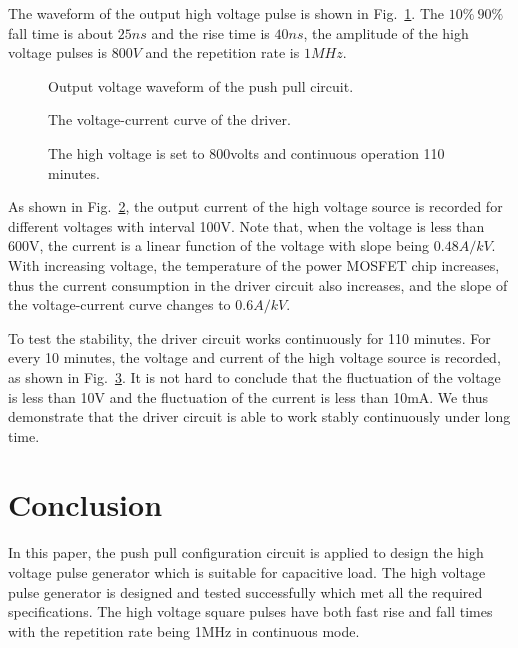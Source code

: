 \documentclass[aip,rsi,reprint,graphicx]{revtex4-1} %
\begin{document}
The waveform of the output high voltage pulse is shown in Fig.~\ref{Fig4}. The $10\%~90\%$ fall time is about $25ns$ and the rise time is $40 ns$, the amplitude of the high voltage pulses is $800V$ and the repetition rate is $1MHz$.

\begin{figure}
\caption{Output voltage waveform of the push pull circuit.\label{Fig4}}%
\end{figure}

\begin{figure}
\caption{The voltage-current curve of the driver.\label{FIG5}}%
\end{figure}

\begin{figure}
\caption{The high voltage is set to 800volts and continuous operation 110 minutes.\label{Fig6}}%
\end{figure}
As shown in Fig.~\ref{FIG5}, the output current of the high voltage source is recorded for different voltages with interval 100V. Note that, when the voltage is less than 600V, the current is a linear function of the voltage with slope being $0.48A/kV$. With increasing voltage, the temperature of the power MOSFET chip increases, thus the current consumption in the driver circuit also increases, and the slope of the voltage-current curve changes to $0.6A/kV$.

To test the stability, the driver circuit works continuously for 110 minutes. For every 10 minutes, the voltage and current of the high voltage source is recorded, as shown in Fig.~\ref{Fig6}. It is not hard to conclude that the fluctuation of the voltage is less than 10V and the fluctuation of the current is less than 10mA. We thus demonstrate that the driver circuit is able to work stably continuously under long time.

\section{Conclusion}
In this paper, the push pull configuration circuit is applied to design the high voltage pulse generator which is suitable for capacitive load. The high voltage pulse generator is designed and tested successfully which met all the required specifications. The high voltage square pulses have both fast rise and fall times with the repetition rate being 1MHz in continuous mode.
\end{document}
